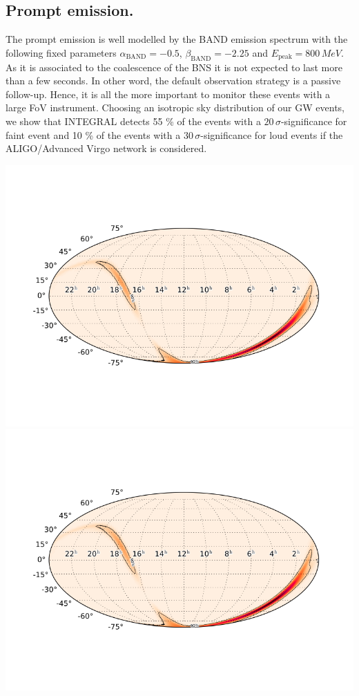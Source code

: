 \documentclass[a0,portrait]{a0poster}
\begin{document}
\begin{multicols}{2}
\subsection*{Prompt emission.}

The prompt emission is well modelled by the BAND emission spectrum with the following fixed parameters $\alpha_{\mathrm{BAND}} = - 0.5$, $\beta_{\mathrm{BAND}} = - 2.25$ and $E_{\mathrm{peak}} = 800 \, MeV$. As it is associated to the coalescence of the BNS it is not expected to last more than a few seconds. In other word, the default observation strategy is a passive follow-up. Hence, it is all the more important to monitor these events with a large FoV instrument. Choosing an isotropic sky distribution of our GW events, we show that INTEGRAL detects 55 \% of the events with a $20 \, \sigma$-significance for faint event and 10 \% of the events with a $30 \, \sigma$-significance for loud events if the ALIGO/Advanced Virgo network is considered.

\begin{center}\vspace{.5cm}
    \includegraphics[scale=1.]{figures/test.png}\includegraphics[scale=1.]{figures/test.png}
    \label{spectra}
\end{center}


\end{multicols}
\end{document}
